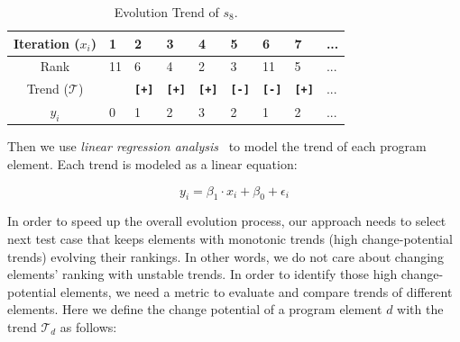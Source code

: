 \begin{table}[t]
	\centering
	\caption{Evolution Trend of $s_8$.}
	\renewcommand{\arraystretch}{1.5}
	\begin{tabular}{cCCCCCCCC}
		\hline
		Iteration ($x_{i}$) &1 &2 &3 &4 &5 &6 &7 &... \\
		\hline\hline
		Rank &11 & 6 & 4 &2 &3 &11 & 5 & ... \\
		Trend ($\mathcal{T}$) & {\bf}&{\bf\texttt{[+]}}&{\bf\texttt{[+]}}&{\bf\texttt{[+]}}&{\bf\texttt{[-]}}&{\bf\texttt{[-]}}&{\bf\texttt{[+]}}&... \\
		$y_{i}$ & 0 & 1 & 2 & 3 & 2 & 1 & 2 & ... \\
		\hline
	\end{tabular}
    \label{tab:trend_example}
\end{table}


\vspace{0.2cm}
 Then we use {\em linear regression analysis}~\citep{GrIy94} to model the trend of each program element. Each trend is modeled as a linear equation:

\begin{equation}
	y_{i}=\beta_{1}\cdot x_{i} + \beta_{0} + \epsilon_{i}
\end{equation}

\vspace{0.2cm}
 In order to speed up the overall evolution process, our approach needs to select next test case that keeps elements with monotonic trends (high change-potential trends) evolving their rankings. In other words, we do not care about changing elements' ranking with unstable trends. In order to identify those high change-potential elements, we need a metric to evaluate and compare trends of different elements. Here we define the change potential of a program element $d$ with the trend $\mathcal{T}_d$ as follows:

